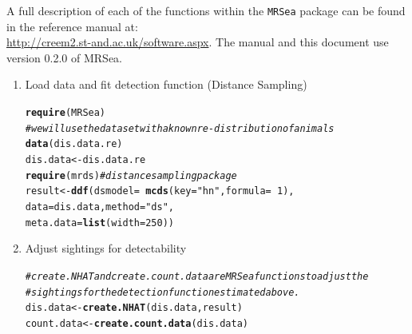\documentclass[10pt, a4paper]{article}\usepackage[]{graphicx}\usepackage[]{color}
\makeatletter
\newcommand{\hlnum}[1]{\textcolor[rgb]{0.686,0.059,0.569}{#1}}%
\newcommand{\hlstr}[1]{\textcolor[rgb]{0.192,0.494,0.8}{#1}}%
\newcommand{\hlcom}[1]{\textcolor[rgb]{0.678,0.584,0.686}{\textit{#1}}}%
\newcommand{\hlopt}[1]{\textcolor[rgb]{0,0,0}{#1}}%
\newcommand{\hlstd}[1]{\textcolor[rgb]{0.345,0.345,0.345}{#1}}%
\newcommand{\hlkwb}[1]{\textcolor[rgb]{0.69,0.353,0.396}{#1}}%
\newcommand{\hlkwc}[1]{\textcolor[rgb]{0.333,0.667,0.333}{#1}}%
\newcommand{\hlkwd}[1]{\textcolor[rgb]{0.737,0.353,0.396}{\textbf{#1}}}%
\newenvironment{kframe}{%
 \def\at@end@of@kframe{}%
 \ifinner\ifhmode%
  \def\at@end@of@kframe{\end{minipage}}%
  \begin{minipage}{\columnwidth}%
 \fi\fi%
 \def\FrameCommand##1{\hskip\@totalleftmargin \hskip-\fboxsep
 \colorbox{shadecolor}{##1}\hskip-\fboxsep
     \hskip-\linewidth \hskip-\@totalleftmargin \hskip\columnwidth}%
 \MakeFramed {\advance\hsize-\width
   \@totalleftmargin\z@ \linewidth\hsize
   \@setminipage}}%
 {\par\unskip\endMakeFramed%
 \at@end@of@kframe}
\newenvironment{knitrout}{}{} %
\makeatother
\begin{document}
\vspace{0.3cm}
A full description of each of the functions within the {\tt MRSea} package can be found in the reference manual at: \\
\href{http://creem2.st-and.ac.uk/software.aspx}{http://creem2.st-and.ac.uk/software.aspx}.  The manual and this document use version 0.2.0 of MRSea.

\vspace{0.3cm}

\begin{enumerate}

\section{Distance sampling using the {\tt mrds} library}

\item Load data and fit detection function (Distance Sampling)
\begin{knitrout}
\color{fgcolor}\begin{kframe}
\begin{alltt}
\hlkwd{require}\hlstd{(MRSea)}
\hlcom{# we will use the dataset with a known re-distribution of animals}
\hlkwd{data}\hlstd{(dis.data.re)}
\hlstd{dis.data}\hlkwb{<-}\hlstd{dis.data.re}
\hlkwd{require}\hlstd{(mrds)} \hlcom{# distance sampling package}
\hlstd{result} \hlkwb{<-} \hlkwd{ddf}\hlstd{(}\hlkwc{dsmodel}\hlstd{=}\hlopt{~}\hlkwd{mcds}\hlstd{(}\hlkwc{key}\hlstd{=}\hlstr{"hn"}\hlstd{,} \hlkwc{formula}\hlstd{=}\hlopt{~}\hlnum{1}\hlstd{),}
              \hlkwc{data} \hlstd{= dis.data,} \hlkwc{method}\hlstd{=}\hlstr{"ds"}\hlstd{,}
              \hlkwc{meta.data}\hlstd{=}\hlkwd{list}\hlstd{(}\hlkwc{width}\hlstd{=}\hlnum{250}\hlstd{))}
\end{alltt}
\end{kframe}
\end{knitrout}

\item Adjust sightings for detectability 
\begin{knitrout}
\color{fgcolor}\begin{kframe}
\begin{alltt}
\hlcom{# create.NHAT and create.count.data are MRSea functions to adjust the }
\hlcom{# sightings for the detection function estimated above.}
\hlstd{dis.data} \hlkwb{<-} \hlkwd{create.NHAT}\hlstd{(dis.data,result)}
\hlstd{count.data} \hlkwb{<-} \hlkwd{create.count.data}\hlstd{(dis.data)}
\end{alltt}
\end{kframe}
\end{knitrout}


\end{enumerate}
\end{document}
